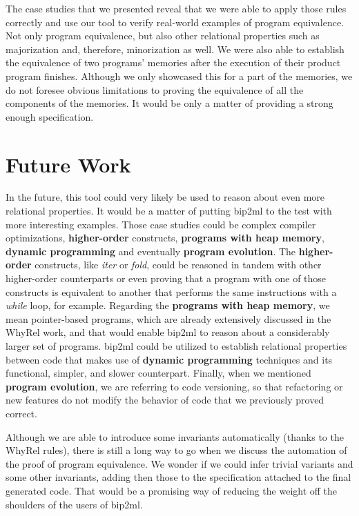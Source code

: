 The case studies that we presented reveal that we were able to apply those rules correctly and use our tool to verify real-world examples of program equivalence.
Not only program equivalence, but also other relational properties such as majorization and, therefore, minorization as well.
We were also able to establish the equivalence of two programs' memories after the execution of their product program finishes.
Although we only showcased this for a part of the memories, we do not foresee obvious limitations to proving the equivalence of all the components of the memories.
It would be only a matter of providing a strong enough specification.


\section{Future Work}
\label{sec:future}

In the future, this tool could very likely be used to reason about even more relational properties.
It would be a matter of putting bip2ml to the test with more interesting examples.
Those case studies could be complex compiler optimizations, \textbf{higher-order} constructs, \textbf{programs with heap memory}, \textbf{dynamic programming} and eventually \textbf{program evolution}.
The \textbf{higher-order} constructs, like \emph{iter} or \emph{fold}, could be reasoned in tandem with other higher-order counterparts or even proving that a program with one of those constructs is equivalent to another that performs the same instructions with a \emph{while} loop, for example. 
Regarding the \textbf{programs with heap memory}, we mean pointer-based programs, which are already extensively discussed in the WhyRel work, and that would enable bip2ml to reason about a considerably larger set of programs.
bip2ml could be utilized to establish relational properties between code that makes use of \textbf{dynamic programming} techniques and its functional, simpler, and slower counterpart.
Finally, when we mentioned \textbf{program evolution}, we are referring to code versioning, so that refactoring or new features do not modify the behavior of code that we previously proved correct.

Although we are able to introduce some invariants automatically (thanks to the WhyRel rules), there is still a long way to go when we discuss the automation of the proof of program equivalence.
We wonder if we could infer trivial variants and some other invariants, adding then those to the specification attached to the final generated code.
That would be a promising way of reducing the weight off the shoulders of the users of bip2ml.
